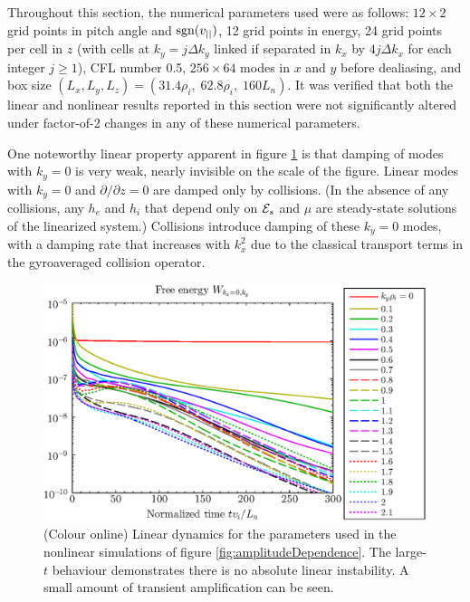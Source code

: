 \documentclass{jpp}
\let\ge=\geqslant  \let\geq=\geqslant
\begin{document}
Throughout this section, the numerical parameters used were as
follows: $12 \times 2$ grid points in pitch angle and $\mbox{sgn}(v_{||})$,
12 grid points in energy, 24 grid points per cell in $z$ (with cells
at $k_y=j \Delta k_y$ linked if separated in $k_x$ by $4 j \Delta k_x$
for each integer $j\ge 1$), CFL number 0.5, $256 \times 64$ modes in $x$
and $y$ before dealiasing, and box size $(L_x, L_y, L_z) = (31.4
\rho_i, \; 62.8 \rho_i, \; 160 L_n)$.  It was verified that both the
linear and nonlinear results reported in this section were not
significantly altered under factor-of-2 changes in any of these
numerical parameters.

One noteworthy linear property apparent in figure \ref{fig:linearBox}
is that damping of modes with $k_y=0$ is very weak,
nearly invisible on the scale of the figure.
Linear modes with $k_y=0$ and $\partial/\partial z=0$ are damped only by collisions.
(In the absence of any collisions, any $h_e$ and $h_i$ that depend only on $\mathcal{E}_s$ and $\mu$ are steady-state solutions of the linearized system.)
Collisions introduce damping of these $k_y=0$ modes, with a damping rate that increases with $k_x^2$ due to the classical transport terms in the gyroaveraged collision operator.


\begin{figure}
\centerline{\includegraphics[width=6in]{fig6.eps}}
\caption{(Colour online)
Linear dynamics for the parameters used in the
nonlinear simulations of figure \ref{fig:amplitudeDependence}.
The large-$t$ behaviour demonstrates there is no absolute linear instability.
A small amount of transient amplification can be seen.
\label{fig:linearBox}}
\end{figure}
\end{document}
